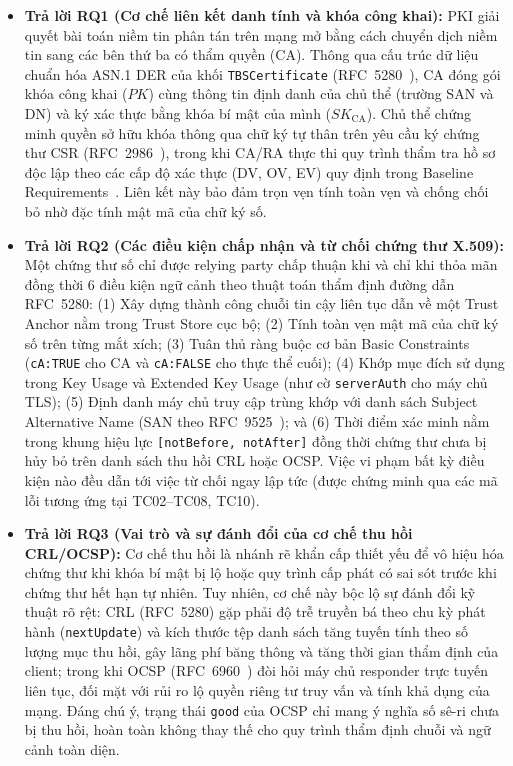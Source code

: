 \begin{itemize}
    \item \textbf{Trả lời RQ1 (Cơ chế liên kết danh tính và khóa công khai):} PKI giải quyết bài toán niềm tin phân tán trên mạng mở bằng cách chuyển dịch niềm tin sang các bên thứ ba có thẩm quyền (CA). Thông qua cấu trúc dữ liệu chuẩn hóa ASN.1 DER của khối \texttt{TBSCertificate} (RFC~5280~\cite{rfc5280}), CA đóng gói khóa công khai ($PK$) cùng thông tin định danh của chủ thể (trường SAN và DN) và ký xác thực bằng khóa bí mật của mình ($SK_{\mathrm{CA}}$). Chủ thể chứng minh quyền sở hữu khóa thông qua chữ ký tự thân trên yêu cầu ký chứng thư CSR (RFC~2986~\cite{rfc2986}), trong khi CA/RA thực thi quy trình thẩm tra hồ sơ độc lập theo các cấp độ xác thực (DV, OV, EV) quy định trong Baseline Requirements~\cite{cabforum_br}. Liên kết này bảo đảm trọn vẹn tính toàn vẹn và chống chối bỏ nhờ đặc tính mật mã của chữ ký số.

    \item \textbf{Trả lời RQ2 (Các điều kiện chấp nhận và từ chối chứng thư X.509):} Một chứng thư số chỉ được relying party chấp thuận khi và chỉ khi thỏa mãn đồng thời 6 điều kiện ngữ cảnh theo thuật toán thẩm định đường dẫn RFC~5280: (1) Xây dựng thành công chuỗi tin cậy liên tục dẫn về một Trust Anchor nằm trong Trust Store cục bộ; (2) Tính toàn vẹn mật mã của chữ ký số trên từng mắt xích; (3) Tuân thủ ràng buộc cơ bản Basic Constraints (\texttt{cA:TRUE} cho CA và \texttt{cA:FALSE} cho thực thể cuối); (4) Khớp mục đích sử dụng trong Key Usage và Extended Key Usage (như cờ \texttt{serverAuth} cho máy chủ TLS); (5) Định danh máy chủ truy cập trùng khớp với danh sách Subject Alternative Name (SAN theo RFC~9525~\cite{rfc9525}); và (6) Thời điểm xác minh nằm trong khung hiệu lực \texttt{[notBefore, notAfter]} đồng thời chứng thư chưa bị hủy bỏ trên danh sách thu hồi CRL hoặc OCSP. Việc vi phạm bất kỳ điều kiện nào đều dẫn tới việc từ chối ngay lập tức (được chứng minh qua các mã lỗi tương ứng tại TC02--TC08, TC10).

    \item \textbf{Trả lời RQ3 (Vai trò và sự đánh đổi của cơ chế thu hồi CRL/OCSP):} Cơ chế thu hồi là nhánh rẽ khẩn cấp thiết yếu để vô hiệu hóa chứng thư khi khóa bí mật bị lộ hoặc quy trình cấp phát có sai sót trước khi chứng thư hết hạn tự nhiên. Tuy nhiên, cơ chế này bộc lộ sự đánh đổi kỹ thuật rõ rệt: CRL (RFC~5280) gặp phải độ trễ truyền bá theo chu kỳ phát hành (\texttt{nextUpdate}) và kích thước tệp danh sách tăng tuyến tính theo số lượng mục thu hồi, gây lãng phí băng thông và tăng thời gian thẩm định của client; trong khi OCSP (RFC~6960~\cite{rfc6960}) đòi hỏi máy chủ responder trực tuyến liên tục, đối mặt với rủi ro lộ quyền riêng tư truy vấn và tính khả dụng của mạng. Đáng chú ý, trạng thái \texttt{good} của OCSP chỉ mang ý nghĩa số sê-ri chưa bị thu hồi, hoàn toàn không thay thế cho quy trình thẩm định chuỗi và ngữ cảnh toàn diện.


\end{itemize}
